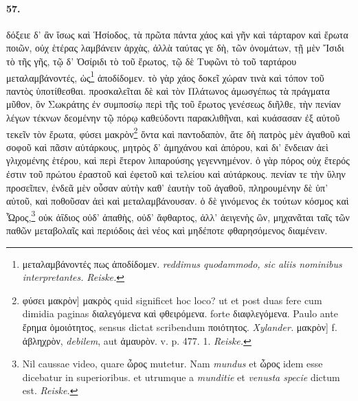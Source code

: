 \documentclass[a4paper, 11pt, oneside, polutonikogreek, german, landscape]{article}
\begin{document}
\paragraph{57.}
δόξειε δ' ἂν ἴσως καὶ Ἡσίοδος, τὰ πρῶτα πάντα χάος καὶ γῆν καὶ τάρταρον καὶ ἔρωτα ποιῶν, οὐχ ἑτέρας λαμβάνειν ἀρχὰς, ἀλλὰ ταύτας γε δὴ, τῶν ὀνομάτων, τῇ μὲν Ἴσιδι τὸ τῆς γῆς, τῷ δ' Ὀσίριδι τὸ τοῦ ἔρωτος, τῷ δὲ Τυφῶνι τὸ τοῦ ταρτάρου μεταλαμβάνοντές, ὡς\footnote{μεταλαμβάνοντές πως ἀποδίδομεν. \emph{reddimus quodammodo, sic aliis nominibus interpretantes.} \emph{Reiske.}} ἀποδίδομεν. τὸ γὰρ χάος δοκεῖ χώραν τινὰ καὶ τόπον τοῦ παντὸς ὑποτίθεσθαι. προσκαλεῖται δὲ καὶ τὸν Πλάτωνος ἀμωσγέπως τὰ πράγματα μῦθον, ὃν Σωκράτης ἐν συμποσίῳ περὶ τῆς τοῦ ἔρωτος γενέσεως διῆλθε, τὴν πενίαν λέγων τέκνων δεομένην τῷ πόρῳ καθεύδοντι παρακλιθῆναι, καὶ κυάσασαν ἐξ αὐτοῦ τεκεῖν τὸν ἔρωτα, φύσει μακρὸν\footnote{φύσει μακρὸν] μακρὸς quid significet hoc loco? ut et post duas fere cum dimidia paginas διαλεγόμενα καὶ φθειρόμενα. forte διαφλεγόμενα. Paulo ante ἔρημα ὁμοιότητος, sensus dictat scribendum ποιότητος. \emph{Xylander.} μακρὸν] f. ἀβληχρὸν, \emph{debilem}, aut ἀμαυρὸν. v. p. 477. 1. \emph{Reiske.} } ὄντα καὶ παντοδαπὸν, ἅτε δὴ πατρὸς μὲν ἀγαθοῦ καὶ σοφοῦ καὶ πᾶσιν αὐτάρκους, μητρὸς δ' ἀμηχάνου καὶ ἀπόρου, καὶ δι' ἔνδειαν ἀεὶ γλιχομένης ἑτέρου, καὶ περὶ ἕτερον λιπαρούσης γεγεννημένον. ὁ γὰρ πόρος οὐχ ἕτερός ἐστιν τοῦ πρώτου ἐραστοῦ καὶ ἐφετοῦ καὶ τελείου καὶ αὐτάρκους. πενίαν τε τὴν ὕλην προσεῖπεν, ἐνδεᾶ μὲν οὖσαν αὐτὴν καθ' ἑαυτὴν τοῦ ἀγαθοῦ, πληρουμένην δὲ ὑπ' αὐτοῦ, καὶ ποθοῦσαν ἀεὶ καὶ μεταλαμβάνουσαν. ὁ δὲ γινόμενος ἐκ τούτων κόσμος καὶ Ὧρος,\footnote{Nil caussae video, quare ὦρος mutetur. Nam \emph{mundus} et ὦρος idem esse dicebatur in superioribus. et utrumque a \emph{munditie} et \emph{venusta specie} dictum est. \emph{Reiske.}} οὐκ ἀΐδιος οὐδ' ἀπαθὴς, οὐδ' ἄφθαρτος, ἀλλ' ἀειγενὴς ὢν, μηχανᾶται ταῖς τῶν παθῶν μεταβολαῖς καὶ περιόδοις ἀεὶ νέος καὶ μηδέποτε φθαρησόμενος διαμένειν.
\end{document}
